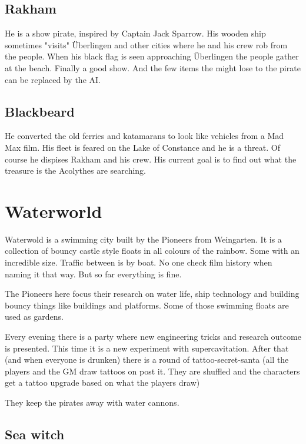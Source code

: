 \subsection{Rakham}

He is a show pirate, inspired by Captain Jack Sparrow. His wooden ship sometimes "visits" Überlingen and other cities where he and his crew rob from the people. When his black flag is seen approaching Überlingen the people gather at the beach. Finally a good show. And the few items the might lose to the pirate can be replaced by the AI.

\subsection{Blackbeard}

He converted the old ferries and katamarans to look like vehicles from a Mad Max film. His fleet is feared on the Lake of Constance and he is a threat. Of course he dispises Rakham and his crew. His current goal is to find out what the treasure is the Acolythes are searching.

\section{Waterworld}

Waterwold is a swimming city built by the Pioneers from Weingarten. It is a collection of bouncy castle style floats in all colours of the rainbow. Some with an incredible size. Traffic between is by boat. No one check film history when naming it that way. But so far everything is fine.

The Pioneers here focus their research on water life, ship technology and building bouncy things like buildings and platforms. Some of those swimming floats are used as gardens.

Every evening there is a party where new engineering tricks and research outcome is presented. This time it is a new experiment with supercavitation. After that (and when everyone is drunken) there is a round of tattoo-secret-santa (all the players and the GM draw tattoos on post it. They are shuffled and the characters get a tattoo upgrade based on what the players draw)

They keep the pirates away with water cannons.

\subsection{Sea witch}

